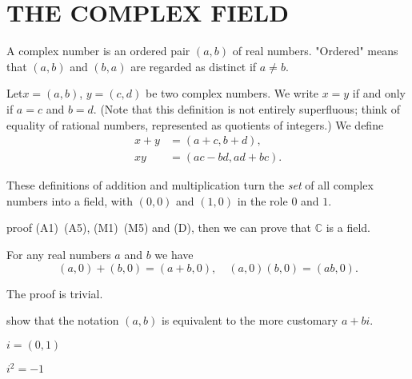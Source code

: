 
\section{THE COMPLEX FIELD}


\begin{myDefinition}\label{myDefinition:complexnumber1.24}
    A complex number is an ordered pair $(a, b)$ of real numbers.
"Ordered" means that $(a, b)$ and $(b, a)$ are regarded as distinct if $a \neq b$.

Let$x = (a, b)$, $y = (c,d)$ be two complex numbers. We write $x =y$ if and
only if $a =c$ and $b=d$. (Note that this definition is not entirely superfluous;
think of equality of rational numbers, represented as quotients of integers.) We
define
\begin{align*}
    x+y &= (a+c, b+d),\\
    xy  &= (ac - bd, ad + bc).
\end{align*}
\end{myDefinition}

\begin{thm}\label{thm:complexnumberisfield}
    These definitions of addition and multiplication turn the \emph{set} of all complex numbers into a field, with $(0, 0)$ and $(1, 0)$ in the role $0$ and $1$.
\end{thm}

proof (A1)~(A5), (M1)~(M5) and (D), then we can prove that $\mathbb{C}$ is a field.

\begin{thm}\label{thm:realincomplex}
    For any real numbers $a$ and $b$ we have
    \begin{equation*}
        (a,0)+ (b,0) = (a+ b,0),\quad
        (a,0)(b,0) = (ab,0).
    \end{equation*}
\end{thm}
The proof is trivial.

show that the notation $(a, b)$ is equivalent to the more customary $a + bi$.

\begin{myDefinition}\label{myDefinition:image_number}
    $i=(0,1)$    
\end{myDefinition}

\begin{thm}\label{thm:sqartrootofminus1}
    $i^2=-1$
\end{thm}

